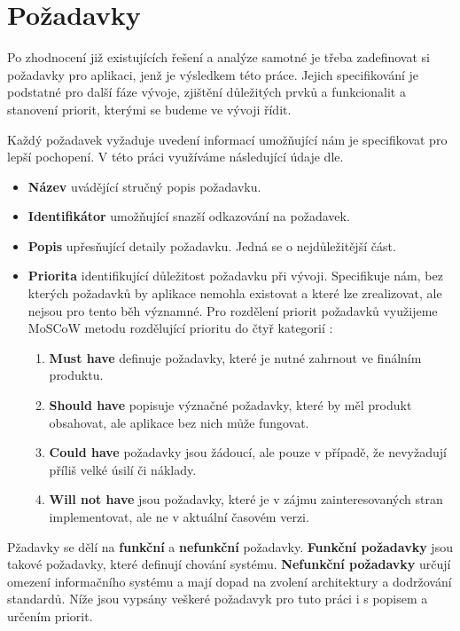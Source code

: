 \section{Požadavky}
Po zhodnocení již existujících řešení a analýze samotné je třeba zadefinovat si požadavky
pro aplikaci, jenž je výsledkem této práce. Jejich specifikování je podstatné pro další fáze vývoje,
zjištění důležitých prvků a funkcionalit a stanovení priorit, kterými se budeme ve vývoji řídit.

Každý požadavek vyžaduje uvedení informací umožňující nám je specifikovat pro lepší pochopení. V této práci
využíváme následující údaje dle. %

\begin{itemize}
  \item \textbf{Název} uvádějící stručný popis požadavku.
  \item \textbf{Identifikátor} umožňující snazší odkazování na požadavek.
  \item \textbf{Popis} upřesňující detaily požadavku. Jedná se o nejdůležitější část.
  \item \textbf{Priorita} identifikující důležitost požadavku při vývoji. Specifikuje nám, 
  bez kterých požadavků by aplikace nemohla existovat a které lze zrealizovat, ale nejsou pro tento běh významné. 
  Pro rozdělení priorit požadavků využijeme MoSCoW metodu rozdělující prioritu do čtyř kategorií \cite{moscow}:
   \begin{enumerate}
    \item \textbf{Must have} definuje požadavky, které je nutné zahrnout ve finálním produktu.
    \item \textbf{Should have} popisuje význačné požadavky, které by měl produkt obsahovat, ale aplikace bez nich může fungovat.
    \item \textbf{Could have} požadavky jsou žádoucí, ale pouze v případě, že nevyžadují příliš velké úsilí či náklady.
    \item \textbf{Will not have} jsou požadavky, které je v zájmu zainteresovaných stran implementovat, ale ne v aktuální časovém verzi.
    \end{enumerate}
\end{itemize}

Pžadavky se dělí na \textbf{funkční} a \textbf{nefunkční} požadavky. \textbf{Funkční požadavky} jsou takové požadavky, které
definují chování systému. \textbf{Nefunkční požadavky} určují omezení informačního systému a mají dopad na zvolení architektury a dodržování standardů.
Níže jsou vypsány veškeré požadavyk pro tuto práci i s popisem a určením priorit.

